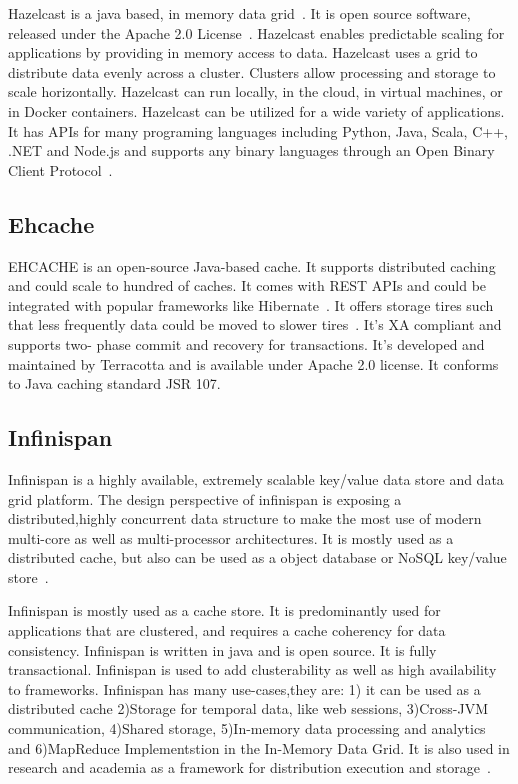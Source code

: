 Hazelcast is a java based, in memory data grid~\cite{www-wikihazel}.
It is open source software, released under the Apache 2.0
License~\cite{www-githubhazel}. Hazelcast enables predictable scaling
for applications by providing in memory access to data.  Hazelcast
uses a grid to distribute data evenly across a cluster. Clusters allow
processing and storage to scale horizontally. Hazelcast can run
locally, in the cloud, in virtual machines, or in Docker
containers. Hazelcast can be utilized for a wide variety of
applications. It has APIs for many programing languages including
Python, Java, Scala, C++, .NET and Node.js and supports any binary
languages through an Open Binary Client Protocol~\cite{www-wikihazel}.

\subsection{Ehcache}

EHCACHE is an open-source Java-based cache. It supports distributed
caching and could scale to hundred of caches. It comes with REST APIs
and could be integrated with popular frameworks like
Hibernate~\cite{www-ehcache-features}. It offers storage tires such
that less frequently data could be moved to slower
tires~\cite{www-ehcache-documentation}. It's XA compliant and supports
two- phase commit and recovery for transactions. It's developed and
maintained by Terracotta and is available under Apache 2.0 license.
It conforms to Java caching standard JSR 107.

\subsection{Infinispan}

Infinispan is a highly available, extremely scalable key/value data
store and data grid platform. The design perspective of infinispan is
exposing a distributed,highly concurrent data structure to make the
most use of modern multi-core as well as multi-processor
architectures. It is mostly used as a distributed cache, but also can
be used as a object database or NoSQL key/value
store~\cite{infinispan.org}.

Infinispan is mostly used as a cache store. It is predominantly used
for applications that are clustered, and requires a cache coherency
for data consistency. Infinispan is written in java and is open
source. It is fully transactional. Infinispan is used to add
clusterability as well as high availability to frameworks.  Infinispan
has many use-cases,they are: 1) it can be used as a distributed cache
2)Storage for temporal data, like web sessions, 3)Cross-JVM
communication, 4)Shared storage, 5)In-memory data processing and
analytics and 6)MapReduce Implementstion in the In-Memory Data
Grid. It is also used in research and academia as a framework for
distribution execution and storage~\cite{infinispan_wikipedia}.
     

